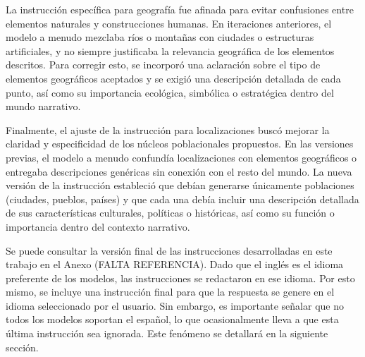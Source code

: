 La instrucción específica para geografía fue afinada
para evitar confusiones entre elementos naturales y construcciones humanas.
En iteraciones anteriores, el modelo a menudo mezclaba ríos o montañas con ciudades o estructuras artificiales,
y no siempre justificaba la relevancia geográfica de los elementos descritos.
Para corregir esto, se incorporó una aclaración sobre el tipo de elementos geográficos aceptados
y se exigió una descripción detallada de cada punto, así como su importancia ecológica,
simbólica o estratégica dentro del mundo narrativo. 

Finalmente, el ajuste de la instrucción para localizaciones buscó mejorar la claridad y
especificidad de los núcleos poblacionales propuestos.
En las versiones previas, el modelo a menudo confundía localizaciones con elementos geográficos
o entregaba descripciones genéricas sin conexión con el resto del mundo.
La nueva versión de la instrucción estableció que debían generarse únicamente poblaciones (ciudades, pueblos, países)
y que cada una debía incluir una descripción detallada de sus características culturales, políticas o históricas,
así como su función o importancia dentro del contexto narrativo. 

Se puede consultar la versión final de las instrucciones desarrolladas en este trabajo en el Anexo (FALTA REFERENCIA).
Dado que el inglés es el idioma preferente de los modelos,
las instrucciones se redactaron en ese idioma.
Por esto mismo, se incluye una instrucción final para que la respuesta se genere en el idioma seleccionado por el usuario.
Sin embargo, es importante señalar que no todos los modelos soportan el español,
lo que ocasionalmente lleva a que esta última instrucción sea ignorada.
Este fenómeno se detallará en la siguiente sección.